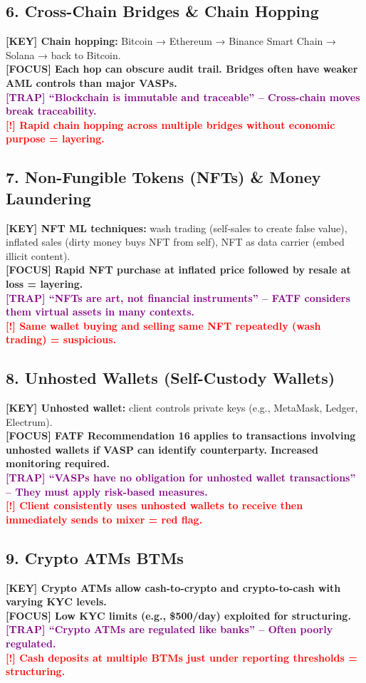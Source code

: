 \documentclass[10pt,a4paper]{article}
\newcommand{\redflag}[1]{\textcolor{red}{\textbf{[!] #1}}}
\newcommand{\examfocus}[1]{\textcolor{orange!80!black}{\textbf{[FOCUS] #1}}}
\newcommand{\trap}[1]{\textcolor{purple}{\textbf{[TRAP] #1}}}
\newcommand{\keyterm}[1]{\textcolor{red!80!black}{\textbf{[KEY] #1}}}
\begin{document}
\subsection*{6. Cross-Chain Bridges \& Chain Hopping}
\keyterm{Chain hopping:} Bitcoin → Ethereum → Binance Smart Chain → Solana → back to Bitcoin. \\
\examfocus{Each hop can obscure audit trail. Bridges often have weaker AML controls than major VASPs.} \\
\trap{“Blockchain is immutable and traceable” – Cross-chain moves break traceability.} \\
\redflag{Rapid chain hopping across multiple bridges without economic purpose = layering.}

\subsection*{7. Non-Fungible Tokens (NFTs) \& Money Laundering}
\keyterm{NFT ML techniques:} wash trading (self-sales to create false value), inflated sales (dirty money buys NFT from self), NFT as data carrier (embed illicit content). \\
\examfocus{Rapid NFT purchase at inflated price followed by resale at loss = layering.} \\
\trap{“NFTs are art, not financial instruments” – FATF considers them virtual assets in many contexts.} \\
\redflag{Same wallet buying and selling same NFT repeatedly (wash trading) = suspicious.}

\subsection*{8. Unhosted Wallets (Self-Custody Wallets)}
\keyterm{Unhosted wallet:} client controls private keys (e.g., MetaMask, Ledger, Electrum). \\
\examfocus{FATF Recommendation 16 applies to transactions involving unhosted wallets if VASP can identify counterparty. Increased monitoring required.} \\
\trap{“VASPs have no obligation for unhosted wallet transactions” – They must apply risk-based measures.} \\
\redflag{Client consistently uses unhosted wallets to receive then immediately sends to mixer = red flag.}

\subsection*{9. Crypto ATMs \/ BTMs}
\keyterm{Crypto ATMs allow cash-to-crypto and crypto-to-cash with varying KYC levels.} \\
\examfocus{Low KYC limits (e.g., \$500/day) exploited for structuring.} \\
\trap{“Crypto ATMs are regulated like banks” – Often poorly regulated.} \\
\redflag{Cash deposits at multiple BTMs just under reporting thresholds = structuring.}
\end{document}
